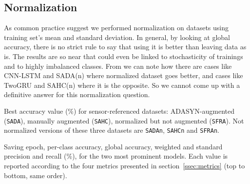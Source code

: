 \subsection{Normalization}
As common practice suggest we performed normalization on datasets using training set's mean and standard deviation.
In general, by looking at global accuracy, there is no strict rule to say that using it is better than leaving data as is.
The results are so near that could even be linked to stochasticity of trainings and to highly imbalanced classes.
From  we can note how there are cases like CNN-LSTM and SADA(n) where normalized dataset goes better, and cases like TwoGRU and SAHC(n) where it is the opposite.
So we cannot come up with a definitive answer for this normalization question.

\begin{table}[ht]
\centering
\caption{Best accuracy value (\%) for sensor-referenced datasets: ADASYN-augmented (\texttt{SADA}), manually augmented (\texttt{SAHC}), normalized but not augmented (\texttt{SFRA}). Not normalized versions of these three datasets are \texttt{SADAn}, \texttt{SAHCn} and \texttt{SFRAn}.}
\label{tab:norm-aug}

\end{table}

\begin{table}[ht]
\centering
\caption{Saving epoch, per-class accuracy, global accuracy, weighted and standard precision and recall (\%), for the two most prominent models.
Each value is reported according to the four metrics presented in section~\ref{ssec:metrics} (top to bottom, same order).}
\label{tab:metrics}

\end{table}

